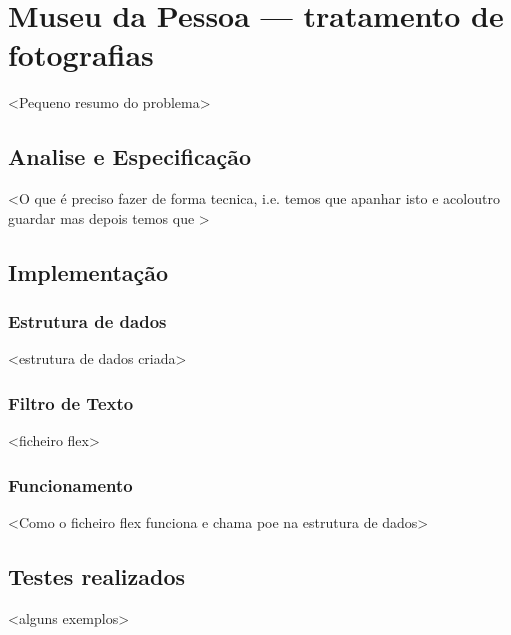 \chapter{Museu da Pessoa — tratamento de fotografias}
\label{cap:museu}
<Pequeno resumo do problema>
\section{Analise e Especificação}
\label{seq:museu-ana}
<O que é preciso fazer de forma tecnica, i.e. temos que apanhar isto e acoloutro guardar mas depois temos que > 
\section{Implementação}
\label{seq:museu-imp}
\subsection{Estrutura de dados}
\label{seq:museu-est}
<estrutura de dados criada>
\subsection{Filtro de Texto}
\label{seq:museu-filtro}
<ficheiro flex>
\subsection{Funcionamento}
\label{seq:museu-func}
<Como o ficheiro flex funciona e chama poe na estrutura de dados>
\section{Testes realizados}
\label{seq:museu-test}
<alguns exemplos>












